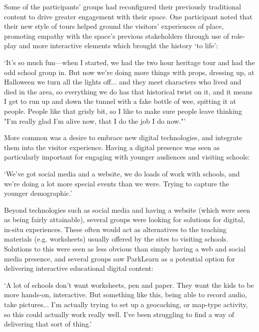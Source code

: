 Some of the participants' groups had reconfigured their previously traditional content to drive greater engagement with their space. One participant noted that their new style of tours helped ground the visitors' experiences of place, promoting empathy with the space's previous stakeholders through use of role-play and more interactive elements which brought the history `to life':

\begin{displayquote}
`It's so much fun---when I started, we had the two hour heritage tour and had the odd school group in. But now we're doing more things with props, dressing up, at Halloween we turn all the lights off... and they meet characters who lived and died in the area, so everything we do has that historical twist on it, and it means I get to run up and down the tunnel with a fake bottle of wee, spitting it at people. People like that grisly bit, so I like to make sure people leave thinking "I'm really glad I'm alive now, that I do the job I do now."'
\end{displayquote}

More common was a desire to embrace new digital technologies, and integrate them into the visitor experience. Having a digital presence was seen as particularly important for engaging with younger audiences and visiting schools:

\begin{displayquote}
`We've got social media and a website, we do loads of work with schools, and we're doing a lot more special events than we were. Trying to capture the younger demographic.'
\end{displayquote}

Beyond technologies such as social media and having a website (which were seen as being fairly attainable), several groups were looking for solutions for digital, in-situ experiences. These often would act as alternatives to the teaching materials (e.g. worksheets) usually offered by the sites to visiting schools. Solutions to this were seen as less obvious than simply having a web and social media presence, and several groups saw ParkLearn as a potential option for delivering interactive educational digital content:

\begin{displayquote}
`A lot of schools don't want worksheets, pen and paper. They want the kids to be more hands-on, interactive. But something like this, being able to record audio, take pictures... I'm actually trying to set up a geocaching, or map-type activity, so this could actually work really well. I've been struggling to find a way of delivering that sort of thing.'
\end{displayquote}


